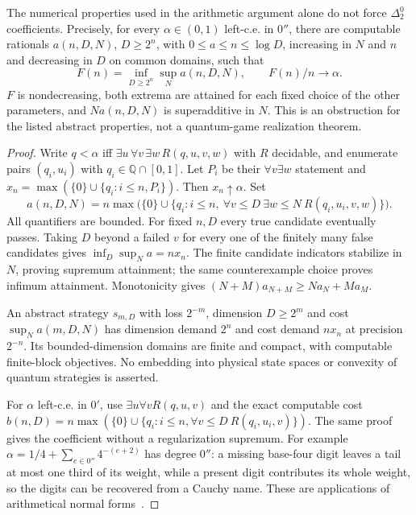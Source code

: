 \begin{proposition}\label{prop:abstract-arithmetic-array}
The numerical properties used in the arithmetic argument alone do not force $\Delta^0_2$ coefficients. Precisely, for every $\alpha\in(0,1)$ left-c.e. in $0''$, there are computable rationals $a(n,D,N)$, $D\ge2^n$, with $0\le a\le n\le\log D$, increasing in $N$ and $n$ and decreasing in $D$ on common domains, such that
\[
 F(n)=\inf_{D\ge2^n}\sup_Na(n,D,N),\qquad F(n)/n\longrightarrow\alpha.
\]
$F$ is nondecreasing, both extrema are attained for each fixed choice of the other parameters, and $Na(n,D,N)$ is superadditive in $N$. This is an obstruction for the listed abstract properties, not a quantum-game realization theorem.
\end{proposition}
\begin{proof}
Write $q<\alpha$ iff $\exists u\,\forall v\,\exists w\,R(q,u,v,w)$ with $R$ decidable, and enumerate pairs $(q_i,u_i)$ with $q_i\in\mathbb Q\cap[0,1]$. Let $P_i$ be their $\forall v\exists w$ statement and $x_n=\max(\{0\}\cup\{q_i:i\le n,P_i\})$. Then $x_n\uparrow\alpha$. Set
\[
 a(n,D,N)=n\max\bigl(\{0\}\cup\{q_i:i\le n,\ \forall v\le D\ \exists w\le N\ R(q_i,u_i,v,w)\}\bigr).
\]
All quantifiers are bounded. For fixed $n,D$ every true candidate eventually passes. Taking $D$ beyond a failed $v$ for every one of the finitely many false candidates gives $\inf_D\sup_Na=nx_n$. The finite candidate indicators stabilize in $N$, proving supremum attainment; the same counterexample choice proves infimum attainment. Monotonicity gives $(N+M)a_{N+M}\ge Na_N+Ma_M$.

An abstract strategy $s_{m,D}$ with loss $2^{-m}$, dimension $D\ge2^m$ and cost $\sup_Na(m,D,N)$ has dimension demand $2^n$ and cost demand $nx_n$ at precision $2^{-n}$. Its bounded-dimension domains are finite and compact, with computable finite-block objectives. No embedding into physical state spaces or convexity of quantum strategies is asserted.

For $\alpha$ left-c.e. in $0'$, use $\exists u\forall vR(q,u,v)$ and the exact computable cost $b(n,D)=n\max(\{0\}\cup\{q_i:i\le n,\forall v\le D\ R(q_i,u_i,v)\})$. The same proof gives the coefficient without a regularization supremum. For example $\alpha=1/4+\sum_{e\in0''}4^{-(e+2)}$ has degree $0''$: a missing base-four digit leaves a tail at most one third of its weight, while a present digit contributes its whole weight, so the digits can be recovered from a Cauchy name. These are applications of arithmetical normal forms~\cite{Sho59}.
\end{proof}

